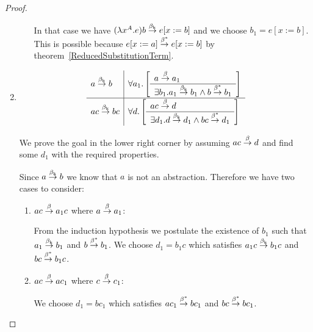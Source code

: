 \begin{lemma}
\begin{proof}
\begin{enumerate}
\begin{enumerate}
                        In that case we have $(\lambda x^A.e)b \stackrel{\beta_{\text{k}}}{\to}
                        e[x:=b]$ and we choose $b_1 = e[x:=b]$. This is possible
                        because $e[x:=a] \stackrel{\beta^*}{\to} e[x:=b]$ by
                        theorem~\ref{ReducedSubstitutionTerm}.
                \end{enumerate}

            \item
                $$
                \begin{array}{l|l}
                    a \stackrel{\beta_{\text{k}}}{\to} b
                    &
                    \forall a_1. \left[ \begin{array}{l} a \stackrel{\beta}{\to} a_1 \\ \hline 
                        \exists b_1. a_1 \stackrel{\beta_{\text{k}}}{\to} b_1 \land b \stackrel{\beta^*}{\to} b_1
                    \end{array} \right]
                    \\
                    \hline
                    ac \stackrel{\beta_{\text{k}}}{\to} bc
                    &
                    \forall d. \left[ \begin{array}{l} ac \stackrel{\beta}{\to} d \\ \hline 
                        \exists d_1. d \stackrel{\beta_{\text{k}}}{\to} d_1 \land bc \stackrel{\beta^*}{\to} d_1
                    \end{array} \right]
                \end{array}
                $$

                We prove the goal in the lower right corner by assuming $ac
                \stackrel{\beta}{\to} d$ and find some $d_1$ with the required properties.

                Since $a \stackrel{\beta_{\text{k}}}{\to} b$ we know that $a$ is not an abstraction.
                Therefore we have two cases to consider:
                \begin{enumerate}
                    \item $ac \stackrel{\beta}{\to} a_1 c$ where $a \stackrel{\beta}{\to} a_1$:

                        From the induction hypothesis we postulate the existence
                        of $b_1$ such that $a_1 \stackrel{\beta_{\text{k}}}{\to} b_1$ and $b
                        \stackrel{\beta^*}{\to} b_1$. We choose $d_1 = b_1 c$ which
                        satisfies $a_1 c \stackrel{\beta_{\text{k}}}{\to} b_1 c$ and $bc \stackrel{\beta^*}{\to}
                        b_1 c$.

                    \item $ac \stackrel{\beta}{\to} a c_1$ where $c \stackrel{\beta}{\to} c_1$:

                        We choose $d_1 = b c_1$ which satisfies $a c_1
                        \stackrel{\beta^*}{\to} b c_1$ and $b c \stackrel{\beta^*}{\to} b c_1$.
                \end{enumerate}
        \end{enumerate}
    \end{proof}
\end{lemma}





